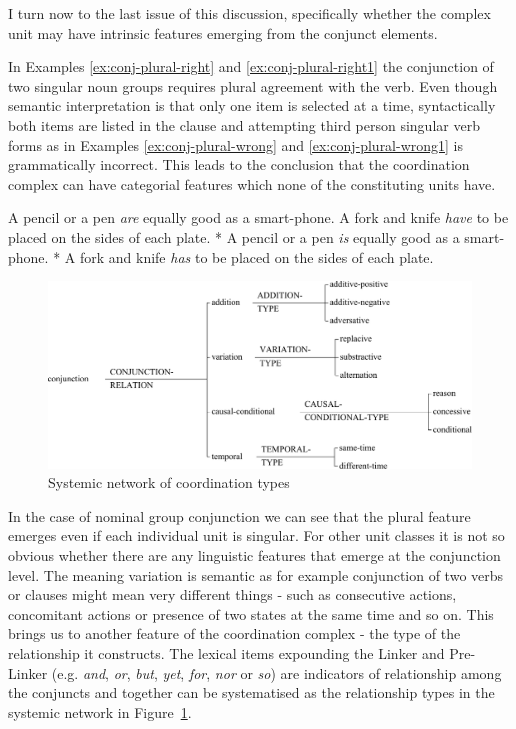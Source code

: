     I turn now to the last issue of this discussion, specifically whether the complex unit may have intrinsic features emerging from the conjunct elements. 
    
    In Examples \ref{ex:conj-plural-right} and \ref{ex:conj-plural-right1} the conjunction of two singular noun groups requires plural agreement with the verb. Even though semantic interpretation is that only one item is selected at a time, syntactically both items are listed in the clause and attempting third person singular verb forms as in Examples \ref{ex:conj-plural-wrong} and \ref{ex:conj-plural-wrong1} is grammatically incorrect. This leads to the conclusion that the coordination complex can have categorial features which none of the constituting units have. 
    
    \begin{exe}
    	\ex\label{ex:conj-plural-right}
    	A pencil or a pen \textit{are} equally good as a smart-phone.
    	\ex\label{ex:conj-plural-right1} A fork and knife \textit{have} to be placed on the sides of each plate.
    	\ex\label{ex:conj-plural-wrong} * A pencil or a pen \textit{is} equally good as a smart-phone.
    	\ex\label{ex:conj-plural-wrong1} * A fork and knife \textit{has} to be placed on the sides of each plate.
    \end{exe}

    \begin{figure}[!h]
    	\centering
    	\includegraphics[width=\textwidth]{Figures/SFL-grammar/conjunction-system.pdf}
    	\caption{Systemic network of coordination types}
    	\label{fig:conj-rel-types}
    \end{figure}

    In the case of nominal group conjunction we can see that the plural feature emerges even if each individual unit is singular. For other unit classes it is not so obvious whether there are any linguistic features that emerge at the conjunction level. The meaning variation is semantic as for example conjunction of two verbs or clauses might mean very different things - such as consecutive actions, concomitant actions or presence of two states at the same time and so on. This brings us to another feature of the coordination complex - the type of the relationship it constructs. The lexical items expounding the Linker and Pre-Linker (e.g. \textit{and}, \textit{or}, \textit{but}, \textit{yet}, \textit{for}, \textit{nor} or \textit{so}) are indicators of relationship among the conjuncts and together can be systematised as the relationship types in the systemic network in \mbox{Figure \ref{fig:conj-rel-types}}.

